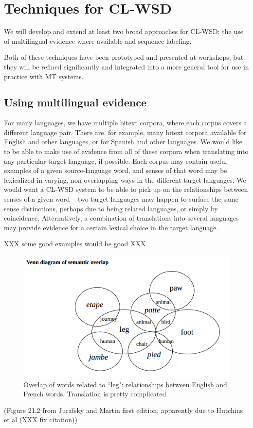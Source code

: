 \section{Techniques for CL-WSD}

We will develop and extend at least two broad approaches for CL-WSD: the use
of multilingual evidence where available and sequence labeling.

Both of these techniques have been prototyped and presented at workshops, but
they will be refined significantly and integrated into a more general tool for
use in practice with MT systems.

\subsection{Using multilingual evidence}
For many languages, we have multiple bitext corpora, where each corpus covers a
different language pair. There are, for example, many bitext corpora available
for English and other languages, or for Spanish and other languages.
We would like to be able to make use of evidence from all of these corpora when
translating into any particular target language, if possible.
Each corpus may contain useful examples of a given source-language word,
and senses of that word may be lexicalized in varying, non-overlapping ways in
the different target languages.
We would want a CL-WSD system to be able to pick up on the relationships
between senses of a given word -- two target languages may happen to surface
the same sense distinctions, perhaps due to being related languages, or simply
by coincidence. Alternatively, a combination of translations into several
languages may provide evidence for a certain lexical choice in the target
language.

XXX some good examples would be good XXX

\begin{figure}
  \includegraphics[width=12cm]{hutchins-leg-etc.png}
  \caption{Overlap of words related to ``leg"; relationships between English
  and French words. Translation is pretty complicated.}
  \label{fig:leg}
\end{figure}
(Figure 21.2 from Jurafsky and Martin first edition, apparently due to Hutchins
et al (XXX fix citation))

